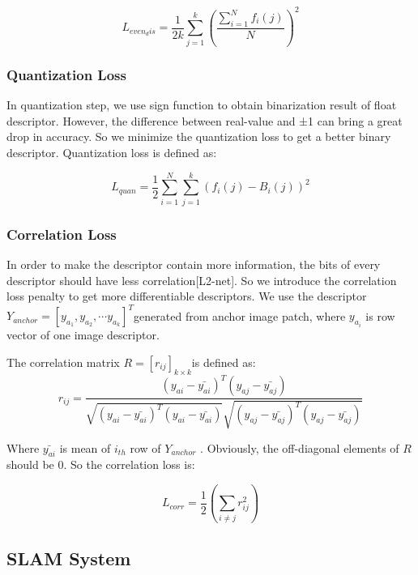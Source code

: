 \documentclass[letterpaper, 10 pt, conference]{ieeeconf}  %
\begin{document}
\begin{equation}
L_{even_dis}  =  \frac{1}{2k}\sum\limits_{j=1}^{k}\left(\frac{\sum\limits_{i=1}^{N}f_i(j)}{N}\right )^2
\end{equation}


\subsubsection{Quantization Loss} 
In quantization step, we use sign function to obtain binarization result of float descriptor. However, the difference between real-value and ±1 can bring a great drop in accuracy. So we minimize the quantization loss to get a better binary descriptor. Quantization loss is defined as:

\begin{equation}
L_{quan}  =  \frac{1}{2}\sum\limits_{i=1}^{N} \sum\limits_{j=1}^{k} \left(f_i(j)-B_i(j) \right )^2
\end{equation}

\subsubsection{Correlation Loss} 
In order to make the descriptor contain more information, the bits of every descriptor should have less correlation[L2-net]. So we introduce the correlation loss penalty to get more differentiable descriptors. We use the descriptor       $ Y_{anchor} = \left [ y_{a_1}, y_{a_2},\cdots y_{a_k}\right ]^{T} $generated from anchor image patch, where  $y_{a_i}$ is row vector of one image descriptor.

The correlation matrix $ R=[r_{ij}]_{k \times k} $is defined as:
\begin{equation}
r_{ij} = \frac{(y_{ai}-\bar{y_{ai}})^{T}(y_{aj}-\bar{y_{aj}})}{\sqrt{(y_{ai}-\bar{y_{ai}})^{T}(y_{ai}-\bar{y_{ai}})}\sqrt{(y_{aj}-\bar{y_{aj}})^{T}(y_{aj}-\bar{y_{aj}})}} 
\end{equation}

Where $ \bar{y_{ai}}$  is mean of $i_{th}$ row of $Y_{anchor}$ . Obviously, the off-diagonal elements of $R$ should be 0. So the correlation loss is:

\begin{equation}
L_{corr}=\frac{1}{2} \left(\sum\limits_{i \neq j} r_{ij}^2 \right)
\end{equation}

\subsection{SLAM System} 
\end{document}
